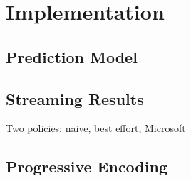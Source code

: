 \section{Implementation}


\subsection{Prediction Model}



\subsection{Streaming Results}

Two policies: naive, best effort, Microsoft


\subsection{Progressive Encoding}


